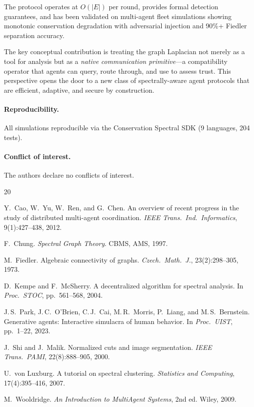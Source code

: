 \documentclass[11pt,a4paper]{article}
\begin{document}
The protocol operates at $O(|E|)$ per round, provides formal detection
guarantees, and has been validated on multi-agent fleet simulations showing
monotonic conservation degradation with adversarial injection and 90\%+
Fiedler separation accuracy.

The key conceptual contribution is treating the graph Laplacian not merely as
a tool for analysis but as a \emph{native communication primitive}---a
compatibility operator that agents can query, route through, and use to assess
trust.  This perspective opens the door to a new class of spectrally-aware
agent protocols that are efficient, adaptive, and secure by construction.

\paragraph{Reproducibility.} All simulations reproducible via the Conservation
Spectral SDK (9 languages, 204 tests).

\paragraph{Conflict of interest.} The authors declare no conflicts of interest.


\begin{thebibliography}{20}

Y.~Cao, W.~Yu, W.~Ren, and G.~Chen.
\newblock An overview of recent progress in the study of distributed
  multi-agent coordination.
\newblock \emph{IEEE Trans.\ Ind.\ Informatics}, 9(1):427--438, 2012.

F.~Chung.
\newblock \emph{Spectral Graph Theory}.
\newblock CBMS, AMS, 1997.

M.~Fiedler.
\newblock Algebraic connectivity of graphs.
\newblock \emph{Czech.\ Math.\ J.}, 23(2):298--305, 1973.

D.~Kempe and F.~McSherry.
\newblock A decentralized algorithm for spectral analysis.
\newblock In \emph{Proc.\ STOC}, pp.~561--568, 2004.

J.\,S.~Park, J.\,C.~O'Brien, C.\,J.~Cai, M.\,R.~Morris, P.~Liang, and
  M.\,S.~Bernstein.
\newblock Generative agents: Interactive simulacra of human behavior.
\newblock In \emph{Proc.\ UIST}, pp.~1--22, 2023.

J.~Shi and J.~Malik.
\newblock Normalized cuts and image segmentation.
\newblock \emph{IEEE Trans.\ PAMI}, 22(8):888--905, 2000.

U.~von Luxburg.
\newblock A tutorial on spectral clustering.
\newblock \emph{Statistics and Computing}, 17(4):395--416, 2007.

M.~Wooldridge.
\newblock \emph{An Introduction to MultiAgent Systems}, 2nd ed.
\newblock Wiley, 2009.

\end{thebibliography}
\end{document}
